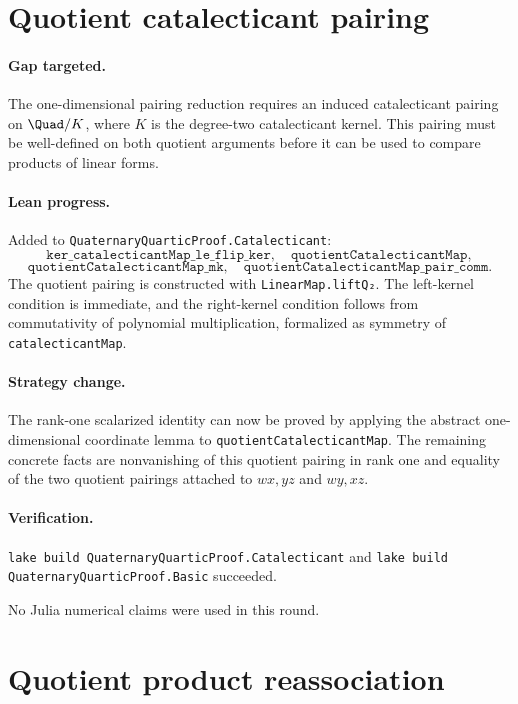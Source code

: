 \documentclass[11pt]{article}
\begin{document}
\section*{Quotient catalecticant pairing}

\paragraph{Gap targeted.}
The one-dimensional pairing reduction requires an induced catalecticant pairing
on \(\Quad/K\), where \(K\) is the degree-two catalecticant kernel.  This
pairing must be well-defined on both quotient arguments before it can be used
to compare products of linear forms.

\paragraph{Lean progress.}
Added to \texttt{QuaternaryQuarticProof.Catalecticant}:
\[
\texttt{ker\_catalecticantMap\_le\_flip\_ker},
\quad
\texttt{quotientCatalecticantMap},
\]
\[
\texttt{quotientCatalecticantMap\_mk},
\quad
\texttt{quotientCatalecticantMap\_pair\_comm}.
\]
The quotient pairing is constructed with \texttt{LinearMap.liftQ₂}.  The
left-kernel condition is immediate, and the right-kernel condition follows
from commutativity of polynomial multiplication, formalized as symmetry of
\texttt{catalecticantMap}.

\paragraph{Strategy change.}
The rank-one scalarized identity can now be proved by applying the abstract
one-dimensional coordinate lemma to \texttt{quotientCatalecticantMap}.  The
remaining concrete facts are nonvanishing of this quotient pairing in rank one
and equality of the two quotient pairings attached to \(wx,yz\) and \(wy,xz\).

\paragraph{Verification.}
\texttt{lake build QuaternaryQuarticProof.Catalecticant} and
\texttt{lake build QuaternaryQuarticProof.Basic} succeeded.

No Julia numerical claims were used in this round.

\section*{Quotient product reassociation}
\end{document}
